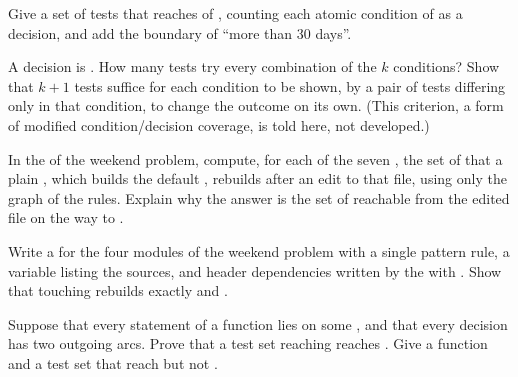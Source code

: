 \begin{exercise}[$\star\star$]\label{exo:b1:c-modules-make-tests:8}
Give a set of tests that reaches  of , counting each atomic condition of \code{&&} as a
decision, and add the boundary of ``more than 30 days''.
\end{exercise}

\begin{exercise}[$\star\star$]\label{exo:b1:c-modules-make-tests:9}
A decision is . How many tests try every combination of the $k$ conditions? Show
that $k + 1$ tests suffice for each condition to be shown, by a pair of tests differing only in that condition, to
change the outcome on its own. (This criterion, a form of modified condition/decision coverage, is told here, not
developed.)
\end{exercise}

\begin{exercise}[$\star\star\star$]\label{exo:b1:c-modules-make-tests:10}
In the  of the weekend problem, compute, for each of the seven , the set of  that
a plain , which builds the default  , rebuilds after an edit to that file, using only
the graph of the rules. Explain why the answer is the set of  reachable from the edited file on the way to
.
\end{exercise}

\begin{exercise}[$\star\star\star$]\label{exo:b1:c-modules-make-tests:11}
Write a  for the four modules of the weekend problem with a single pattern rule, a variable listing the
sources, and header dependencies written by the  with . Show that touching  rebuilds
exactly  and .
\end{exercise}

\begin{exercise}[$\star\star\star$]\label{exo:b1:c-modules-make-tests:12}
Suppose that every statement of a function lies on some , and that every decision has two outgoing arcs.
Prove that a test set reaching  reaches . Give a function and a test set that reach
 but not .
\end{exercise}

